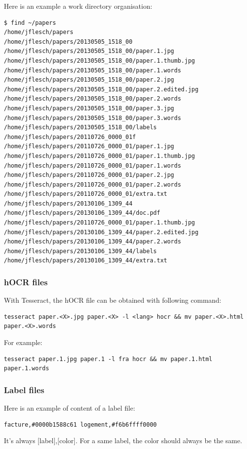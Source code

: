 \documentclass[10pt,a4paper]{article}
\begin{document}
Here is an example a work directory organisation:
\begin{verbatim}
$ find ~/papers
/home/jflesch/papers
/home/jflesch/papers/20130505_1518_00
/home/jflesch/papers/20130505_1518_00/paper.1.jpg
/home/jflesch/papers/20130505_1518_00/paper.1.thumb.jpg
/home/jflesch/papers/20130505_1518_00/paper.1.words
/home/jflesch/papers/20130505_1518_00/paper.2.jpg
/home/jflesch/papers/20130505_1518_00/paper.2.edited.jpg
/home/jflesch/papers/20130505_1518_00/paper.2.words
/home/jflesch/papers/20130505_1518_00/paper.3.jpg
/home/jflesch/papers/20130505_1518_00/paper.3.words
/home/jflesch/papers/20130505_1518_00/labels
/home/jflesch/papers/20110726_0000_01f
/home/jflesch/papers/20110726_0000_01/paper.1.jpg
/home/jflesch/papers/20110726_0000_01/paper.1.thumb.jpg
/home/jflesch/papers/20110726_0000_01/paper.1.words
/home/jflesch/papers/20110726_0000_01/paper.2.jpg
/home/jflesch/papers/20110726_0000_01/paper.2.words
/home/jflesch/papers/20110726_0000_01/extra.txt
/home/jflesch/papers/20130106_1309_44
/home/jflesch/papers/20130106_1309_44/doc.pdf
/home/jflesch/papers/20110726_0000_01/paper.1.thumb.jpg
/home/jflesch/papers/20130106_1309_44/paper.2.edited.jpg
/home/jflesch/papers/20130106_1309_44/paper.2.words
/home/jflesch/papers/20130106_1309_44/labels
/home/jflesch/papers/20130106_1309_44/extra.txt
\end{verbatim}

\subsubsection{hOCR files}

With Tesseract, the hOCR file can be obtained with following command:
\begin{verbatim}
tesseract paper.<X>.jpg paper.<X> -l <lang> hocr && mv paper.<X>.html paper.<X>.words
\end{verbatim}
For example:
\begin{verbatim}
tesseract paper.1.jpg paper.1 -l fra hocr && mv paper.1.html paper.1.words
\end{verbatim}

\subsubsection{Label files}

Here is an example of content of a label file:
\begin{verbatim}
facture,#0000b1588c61 logement,#f6b6ffff0000
\end{verbatim}
It's always $[$label$]$,$[$color$]$. For a same label, the color should
always be the same.
\end{document}
